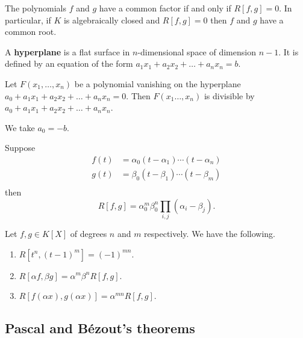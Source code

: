 \documentclass[12pt, a4paper]{article}
\begin{document}
\begin{mdlemma}
    The polynomials \(f\) and \(g\) have a common factor if and only if \(R[f,g]=0\). In particular, if \(K\) is algebraically closed and \(R[f,g]=0\) then \(f\) and \(g\) have a common root.
\end{mdlemma}

\begin{definition}
    A \textbf{hyperplane} is a flat surface in \(n\)-dimensional space of dimension \(n-1\). It is defined by an equation of the form \(a_1x_1 + a_2x_2 + \ldots + a_nx_n = b\).
\end{definition}

\begin{proposition}
    Let \(F(x_1,\ldots,x_n)\) be a polynomial vanishing on the hyperplane \(a_0 + a_1x_1 + a_2x_2 + \ldots + a_nx_n=0\). Then \(F(x_1\ldots,x_n)\) is divisible by \(a_0 + a_1x_1 + a_2x_2 + \ldots + a_nx_n\).
\end{proposition}

\begin{mdremark}
    We take \(a_0 = -b\).
\end{mdremark}

\begin{mdprop}
    Suppose 
    \[\begin{aligned}
        f(t)&= \alpha_0(t-\alpha_1) \cdots (t-\alpha_n) \\
        g(t)&= \beta_0(t-\beta_1) \cdots (t-\beta_m) \\
    \end{aligned}\]
    then 
    \[R[f,g]= \alpha_0^m \beta_0^n \prod_{i,j} (\alpha_i-\beta_j).\]
\end{mdprop}

\begin{mdcor}
    Let \(f,g \in K[X]\) of degrees \(n\) and \(m\) respectively. We have the following. 
    \begin{enumerate}
        \item \(R[t^n,(t-1)^m]=(-1)^{mn}\).
        \item \(R[\alpha f,\beta g] = \alpha^m \beta^n R[f,g]\).
        \item \(R[f(\alpha x),g(\alpha x)] = \alpha^{mn}R[f,g]\).
    \end{enumerate}
\end{mdcor}

\subsection{Pascal and Bézout's theorems}
\end{document}
